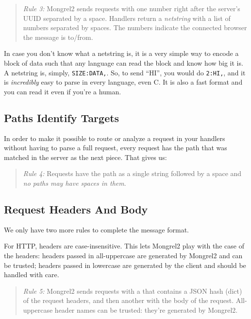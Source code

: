 \begin{quote}
\emph{Rule 3:} Mongrel2 sends requests with one number right after the server's
UUID separated by a space.  Handlers return a \emph{netstring} with a list of
numbers separated by spaces.  The numbers indicate the connected browser the
message is to/from.
\end{quote}

In case you don't know what a netstring is, it is a very simple way to encode a
block of data such that any language can read the block and know how big it is.
A netstring is, simply, \verb|SIZE:DATA,|. So, to send ``HI'', you would do
\verb|2:HI,|, and it is \emph{incredibly} easy to parse in every language, even
C\@.  It is also a fast format and you can read it even if you're a human.


\subsection{Paths Identify Targets}

In order to make it possible to route or analyze a request in your handlers
without having to parse a full request, every request has the path that
was matched in the server as the next piece.  That gives us:

\begin{quote}
\emph{Rule 4:} Requests have the path as a single string followed by a
    space and \emph{no paths may have spaces in them}.
\end{quote}


\subsection{Request Headers And Body}

We only have two more rules to complete the message format.

For HTTP, headers are case-insensitive. This lets Mongrel2 play with the case
of the headers: headers passed in all-uppercase are generated by Mongrel2 and
can be trusted; headers passed in lowercase are generated by the client and
should be handled with care.

\begin{quote}
\emph{Rule 5:} Mongrel2 sends requests with a  that contains a
JSON hash (dict) of the request headers, and then another 
with the body of the request. All-uppercase header names can be trusted:
they're generated by Mongrel2.
\end{quote}

